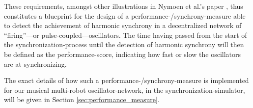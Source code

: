 	These requirements, amongst other illustrations in Nymoen et al.'s paper \cite{nymoen_synch}, thus constitutes a blueprint for the design of a performance-/synchrony-measure able to detect the achievement of harmonic synchrony in a decentralized network of ``firing''—or pulse-coupled—oscillators. The time having passed from the start of the synchronization-process until the detection of harmonic synchrony will then be defined as the performance-score, indicating how fast or slow the oscillators are at synchronizing.
	
	The exact details of how such a performance-/synchrony-measure is implemented for our musical multi-robot oscillator-network, in the synchronization-simulator, will be given in Section \ref{sec:performance_measure}.


















	